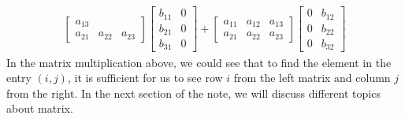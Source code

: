 \documentclass[../../main.tex]{subfiles}
\begin{document}
\begin{align*}
\begin{bmatrix}
    \scriptstyle a_{13} \\
    \scriptstyle a_{21} &
    \scriptstyle a_{22} &
    \scriptstyle a_{23}
\end{bmatrix}
\begin{bmatrix}
    \scriptstyle b_{11} & \scriptstyle 0 \\
    \scriptstyle b_{21} & \scriptstyle 0 \\
    \scriptstyle b_{31} & \scriptstyle 0
\end{bmatrix}
+
\begin{bmatrix}
    \scriptstyle a_{11} &
    \scriptstyle a_{12} &
    \scriptstyle a_{13} \\
    \scriptstyle a_{21} &
    \scriptstyle a_{22} &
    \scriptstyle a_{23}
\end{bmatrix}
\begin{bmatrix}
    \scriptstyle 0 & \scriptstyle b_{12} \\
    \scriptstyle 0 & \scriptstyle b_{22} \\
    \scriptstyle 0 & \scriptstyle b_{32}
\end{bmatrix}
\end{align*}
In the matrix multiplication above, we could see that to find
the element in the entry $(i, j)$, it is sufficient for us to
see row $i$ from the left matrix and column $j$ from the right.
In the next section of the note, we will discuss different
topics about matrix.
\end{document}
